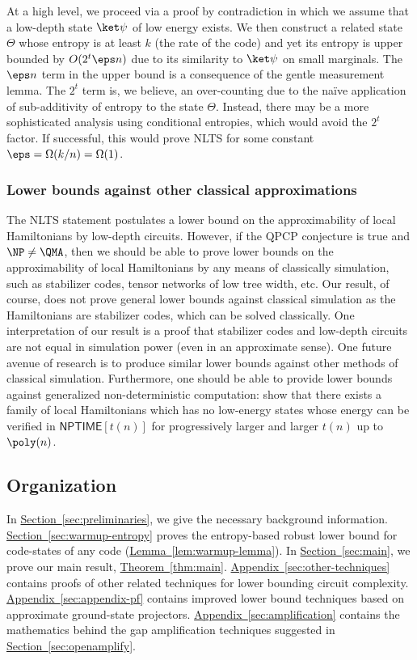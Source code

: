 \documentclass[11pt]{article}
\newcommand{\expref}[2]{\texorpdfstring{\hyperref[#2]{#1~\ref{#2}}}{#1~\ref{#2}}}
\begin{document}
At a high level, we proceed via a %
proof by contradiction   %
in which we assume that a low-depth state $\ket \psi$ of %
low energy  %
exists. We then construct a related state $\Theta$ whose entropy is at least $k$ (the rate of the code) and yet its entropy is upper bounded by $O(2^t \eps n)$ due to its similarity to $\ket \psi$ on small marginals. The $\eps n$ term in the upper bound is a consequence of the gentle measurement lemma. 
The $2^t$ term is, we believe, an over-counting due to the na\"ive application of sub-additivity of entropy to the state $\Theta$. Instead, there may be a more sophisticated analysis using conditional entropies, which would avoid the $2^t$ factor. If successful, this would prove NLTS for some constant $\eps = \Omega(k/n) = \Omega(1)$.

\subsubsection{Lower bounds against other classical approximations}

The NLTS statement postulates a lower bound on the approximability of local Hamiltonians by
low-depth circuits. %
However, if the QPCP conjecture is true and $\NP \neq \QMA$, then we should be able to prove lower bounds on the approximability of local Hamiltonians by any means of classically simulation, such as stabilizer codes, tensor networks of low tree width, etc. Our result, of course, does not prove general lower bounds against classical simulation as the Hamiltonians are stabilizer codes, which can be solved classically. One interpretation of our result is a proof that stabilizer codes and low-depth circuits
%
are not equal in simulation power (even in an approximate sense). One future avenue of research is to produce similar lower bounds against other methods of classical simulation. Furthermore, one should be able to provide lower bounds against generalized non-deterministic computation: show that there exists a family of local Hamiltonians which has no low-energy states whose energy can be verified in $\textsf{NPTIME}[t(n)]$ for progressively larger and larger $t(n)$ up to $\poly(n)$.

%
\subsection{Organization}
In \expref{Section}{sec:preliminaries}, we give the necessary background information. \expref{Section}{sec:warmup-entropy} proves the entropy-based robust lower bound for code-states of any code (\expref{Lemma}{lem:warmup-lemma}). In \expref{Section}{sec:main}, we prove our main result, \expref{Theorem}{thm:main}. \expref{Appendix}{sec:other-techniques} contains proofs of other related techniques for lower bounding circuit complexity. \expref{Appendix}{sec:appendix-pf} contains improved lower bound techniques based on approximate ground-state projectors. \expref{Appendix}{sec:amplification} contains the mathematics behind the gap amplification techniques suggested in \expref{Section}{sec:openamplify}.
\end{document}
